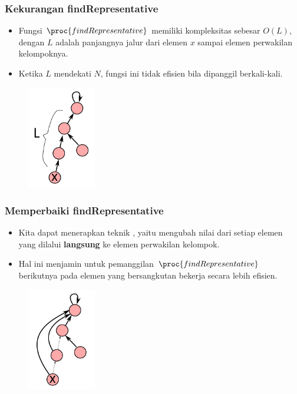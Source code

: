 \begin{frame}
\frametitle{Kekurangan findRepresentative}
\begin{itemize}
  \item Fungsi $\proc{findRepresentative}$ memiliki kompleksitas sebesar $O(L)$, dengan $L$ adalah panjangnya jalur dari elemen $x$ sampai elemen perwakilan kelompoknya.
  \item Ketika $L$ mendekati $N$, fungsi ini tidak efisien bila dipanggil berkali-kali.
\end{itemize}
\begin{figure}
  \includegraphics[width=3cm]{asset/chain-long.pdf}
\end{figure}
\end{frame}

\begin{frame}
\frametitle{Memperbaiki findRepresentative}
\begin{itemize}
  \item Kita dapat menerapkan teknik , yaitu mengubah nilai  dari setiap elemen yang dilalui \textbf{langsung} ke elemen perwakilan kelompok.
  \item Hal ini menjamin untuk pemanggilan $\proc{findRepresentative}$ berikutnya pada elemen yang bersangkutan bekerja secara lebih efisien.
\end{itemize}
\begin{figure}
  \includegraphics[width=3cm]{asset/chain-compressed.pdf}
\end{figure}
\end{frame}

